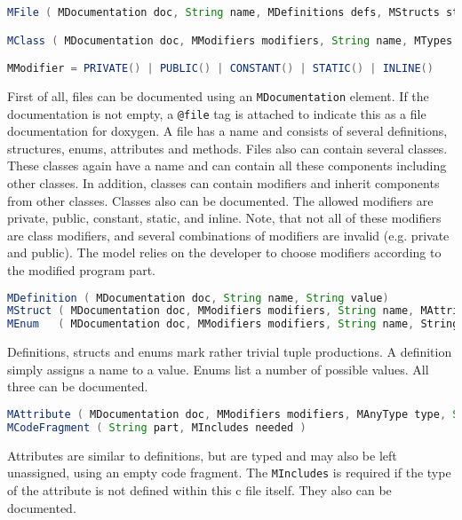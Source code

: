 \documentclass{report}
\begin{document}
\begin{lstlisting}[language=java, breaklines=true]
MFile ( MDocumentation doc, String name, MDefinitions defs, MStructs structs, MEnums enums, MAttributes attributes, MMethods methods, MClasses classes )

MClass ( MDocumentation doc, MModifiers modifiers, String name, MTypes extend, MStructs structs, MEnums enums, MAttributes attributes, MMethods methods, MClasses nested )

MModifier = PRIVATE() | PUBLIC() | CONSTANT() | STATIC() | INLINE()
\end{lstlisting}

First of all, files can be documented using an \texttt{MDocumentation} element. If the documentation is not empty, a \texttt{@file} tag is attached to indicate this as a file documentation for doxygen.  A file has a name and consists of several definitions, structures, enums, attributes and methods. Files also can contain several classes. These classes again have a name and can contain all these components including other classes. In addition, classes can contain modifiers and inherit components from other classes. Classes also can be documented.
The allowed modifiers are private, public, constant, static, and inline. Note, that not all of these modifiers are class modifiers, and several combinations of modifiers are invalid (e.g. private and public). The model relies on the developer to choose modifiers according to the modified program part.

\begin{lstlisting}[language=java, breaklines=true]
MDefinition ( MDocumentation doc, String name, String value)
MStruct ( MDocumentation doc, MModifiers modifiers, String name, MAttributes attributes )
MEnum   ( MDocumentation doc, MModifiers modifiers, String name, Strings values )
\end{lstlisting}

Definitions, structs and enums mark rather trivial tuple productions. A definition simply assigns a name to a value. %
Enums list a number of possible values. All three can be documented.

\begin{lstlisting}[language=java, breaklines=true]
MAttribute ( MDocumentation doc, MModifiers modifiers, MAnyType type, String name, MCodeFragment initial )
MCodeFragment ( String part, MIncludes needed )
\end{lstlisting}

Attributes are similar to definitions, but are typed and may also be left unassigned, using an empty code fragment. The \texttt{MIncludes} is required if the type of the attribute is not defined within this c file itself. They also can be documented.
\end{document}
